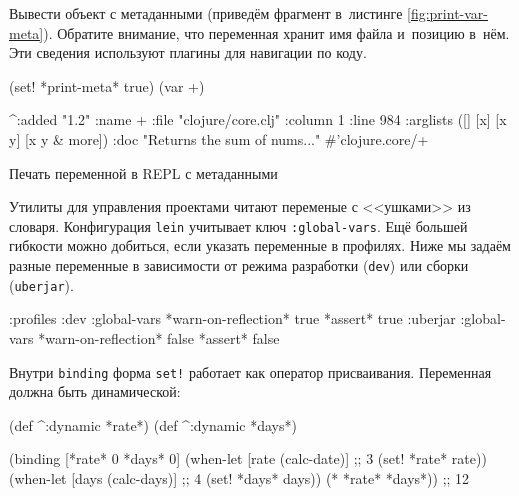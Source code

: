 \noindent
Вывести объект с метаданными (приведём фрагмент в~листинге
\ref{fig:print-var-meta}). Обратите внимание, что переменная хранит имя файла
и~позицию в~нём. Эти сведения используют плагины для навигации по коду.

\begin{listing}[ht!]
  \small

\begin{english}
  \begin{clojure}
(set! *print-meta* true)
(var +)

^{:added "1.2"
  :name +
  :file "clojure/core.clj"
  :column 1
  :line 984
  :arglists ([] [x] [x y] [x y & more])
  :doc "Returns the sum of nums..."}
#'clojure.core/+
  \end{clojure}
\end{english}

\caption{Печать переменной в REPL с метаданными}
\label{fig:print-var-meta}

\end{listing}


Утилиты для управления проектами читают переменые с <<ушками>> из
словаря. Конфигурация \verb|lein| учитывает ключ \verb|:global-vars|. Ещё
большей гибкости можно добиться, если указать переменные в профилях. Ниже мы
задаём разные переменные в зависимости от режима разработки (\verb|dev|) или
сборки (\verb|uberjar|).

\begin{english}
  \begin{clojure}
{:profiles
 :dev {:global-vars {*warn-on-reflection* true
                     *assert* true}}
 :uberjar {:global-vars {*warn-on-reflection* false
                         *assert* false}}}
  \end{clojure}
\end{english}

Внутри \verb|binding| форма \verb|set!| работает как оператор
присваивания. Переменная должна быть динамической:

\begin{english}
  \begin{clojure}
(def ^:dynamic *rate*)
(def ^:dynamic *days*)

(binding [*rate* 0
          *days* 0]
  (when-let [rate (calc-date)] ;; 3
    (set! *rate* rate))
  (when-let [days (calc-days)] ;; 4
    (set! *days* days))
  (* *rate* *days*))
;; 12
  \end{clojure}
\end{english}


